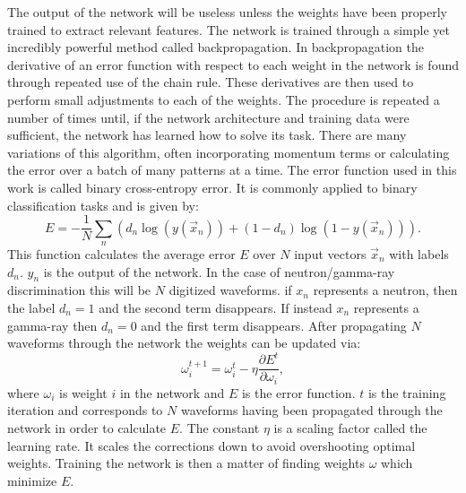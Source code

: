 \documentclass[main.tex]{subfiles}
\begin{document}
The output of the network will be useless unless the weights have been properly trained to extract relevant features. The network is trained through a simple yet incredibly powerful method called backpropagation. In backpropagation the derivative of an error function with respect to each weight in the network is found through repeated use of the chain rule. These derivatives are then used to perform small adjustments to each of the weights. The procedure is repeated a number of times until, if the network architecture and training data were sufficient, the network has learned how to solve its task. There are many variations of this algorithm, often incorporating momentum terms or calculating the error over a batch of many patterns at a time.
The error function used in this work is called binary cross-entropy error. It is commonly applied to binary classification tasks and is given by:
\begin{equation}
	E = -\frac{1}{N}\sum_n\left(	d_n\log(y(\vec x_n))+(1-d_n)\log(1-y(\vec x_n))	\right).
\end{equation}
This function calculates the average error $E$ over $N$ input vectors $\vec x_n$ with labels $d_n$. $y_n$ is the output of the network. In the case of neutron/gamma-ray discrimination this will be $N$ digitized waveforms. if $x_n$ represents a neutron, then the label $d_n=1$ and the second term disappears. If instead $x_n$ represents a gamma-ray then $d_n=0$ and the first term disappears.
After propagating $N$ waveforms through the network the weights can be updated via:
\begin{equation}
	\omega^{t+1}_i = \omega^{t}_i - \eta\frac{\partial E^t}{\partial \omega_i},
\end{equation}
where $\omega_i$ is weight $i$ in the network and $E$ is the error function. $t$ is the training iteration and corresponds to $N$ waveforms having been propagated through the network in order to calculate $E$. The constant $\eta$ is a scaling factor called the learning rate. It scales the corrections down to avoid overshooting optimal weights. Training the network is then a matter of finding weights $\omega$ which minimize $E$.
\end{document}
